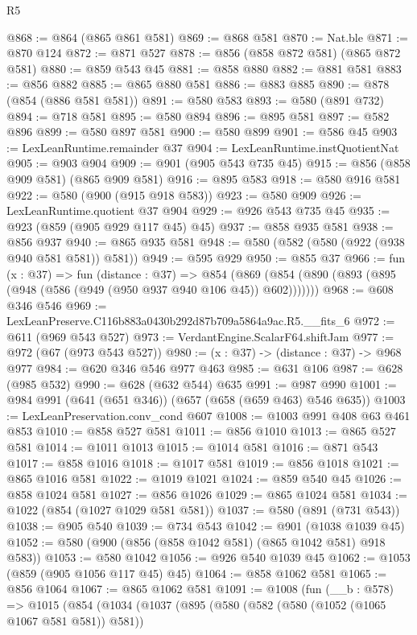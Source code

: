 \begin{lexlean}{R5}
\begin{coremodule}
@868 := @864 (@865 @861 @581)
@869 := @868 @581
@870 := Nat.ble
@871 := @870 @124
@872 := @871 @527
@878 := @856 (@858 @872 @581) (@865 @872 @581)
@880 := @859 @543 @45
@881 := @858 @880
@882 := @881 @581
@883 := @856 @882
@885 := @865 @880 @581
@886 := @883 @885
@890 := @878 (@854 (@886 @581 @581))
@891 := @580 @583
@893 := @580 (@891 @732)
@894 := @718 @581
@895 := @580 @894
@896 := @895 @581
@897 := @582 @896
@899 := @580 @897 @581
@900 := @580 @899
@901 := @586 @45
@903 := LexLeanRuntime.remainder @37
@904 := LexLeanRuntime.instQuotientNat
@905 := @903 @904
@909 := @901 (@905 @543 @735 @45)
@915 := @856 (@858 @909 @581) (@865 @909 @581)
@916 := @895 @583
@918 := @580 @916 @581
@922 := @580 (@900 (@915 @918 @583))
@923 := @580 @909
@926 := LexLeanRuntime.quotient @37 @904
@929 := @926 @543 @735 @45
@935 := @923 (@859 (@905 @929 @117 @45) @45)
@937 := @858 @935 @581
@938 := @856 @937
@940 := @865 @935 @581
@948 := @580 (@582 (@580 (@922 (@938 @940 @581 @581)) @581))
@949 := @595 @929
@950 := @855 @37
@966 := fun (x : @37) =>
  fun (distance : @37) =>
  @854 (@869 (@854 (@890 (@893 (@895 (@948 (@586 (@949 (@950 @937 @940 @106 @45)) @602)))))))
@968 := @608 @346 @546
@969 := LexLeanPreserve.C116b883a0430b292d87b709a5864a9ac.R5.__fits_6
@972 := @611 (@969 @543 @527)
@973 := VerdantEngine.ScalarF64.shiftJam
@977 := @972 (@67 (@973 @543 @527))
@980 := (x : @37) -> (distance : @37) -> @968 @977
@984 := @620 @346 @546 @977 @463
@985 := @631 @106
@987 := @628 (@985 @532)
@990 := @628 (@632 @544) @635
@991 := @987 @990
@1001 := @984 @991 (@641 (@651 @346)) (@657 (@658 (@659 @463) @546 @635))
@1003 := LexLeanPreservation.conv_cond @607
@1008 := @1003 @991 @408 @63 @461 @853
@1010 := @858 @527 @581
@1011 := @856 @1010
@1013 := @865 @527 @581
@1014 := @1011 @1013
@1015 := @1014 @581
@1016 := @871 @543
@1017 := @858 @1016
@1018 := @1017 @581
@1019 := @856 @1018
@1021 := @865 @1016 @581
@1022 := @1019 @1021
@1024 := @859 @540 @45
@1026 := @858 @1024 @581
@1027 := @856 @1026
@1029 := @865 @1024 @581
@1034 := @1022 (@854 (@1027 @1029 @581 @581))
@1037 := @580 (@891 (@731 @543))
@1038 := @905 @540
@1039 := @734 @543
@1042 := @901 (@1038 @1039 @45)
@1052 := @580 (@900 (@856 (@858 @1042 @581) (@865 @1042 @581) @918 @583))
@1053 := @580 @1042
@1056 := @926 @540 @1039 @45
@1062 := @1053 (@859 (@905 @1056 @117 @45) @45)
@1064 := @858 @1062 @581
@1065 := @856 @1064
@1067 := @865 @1062 @581
@1091 := @1008
    (fun (__b : @578) =>
    @1015
      (@854
        (@1034
          (@1037
            (@895
              (@580
                (@582 (@580 (@1052 (@1065 @1067 @581 @581)) @581))

\end{coremodule}
\end{lexlean}
